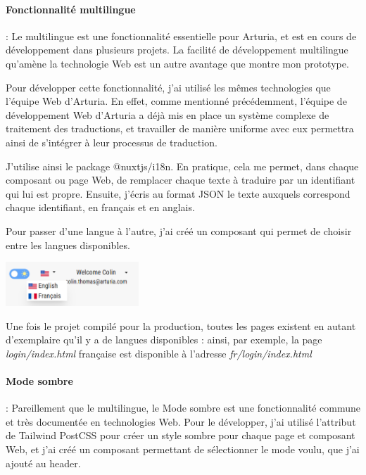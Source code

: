\documentclass[francais]{rapportPFE}  %
\begin{document}
\paragraph{Fonctionnalité multilingue}: Le multilingue est une fonctionnalité essentielle pour Arturia, et est en cours de développement dans plusieurs projets. La facilité de développement multilingue qu'amène la technologie Web est un autre avantage que montre mon prototype.

Pour développer cette fonctionnalité, j'ai utilisé les mêmes technologies que l'équipe Web d'Arturia. En effet, comme mentionné précédemment, l'équipe de développement Web d'Arturia a déjà mis en place un système complexe de traitement des traductions, et travailler de manière uniforme avec eux permettra ainsi de s'intégrer à leur processus de traduction. 

J'utilise ainsi le package @nuxtjs/i18n. En pratique, cela me permet, dans chaque composant ou page Web, de remplacer chaque texte à traduire par un identifiant qui lui est propre. Ensuite, j'écris au format JSON le texte auxquels correspond chaque identifiant, en français et en anglais.

Pour passer d'une langue à l'autre, j'ai créé un composant qui permet de choisir entre les langues disponibles.

\begin{center}
	\centering
	\includegraphics[width=5cm]{graphics/languages.png}
	\begin{tiny}
	\end{tiny}
	\label{fig}
\end{center} 

Une fois le projet compilé pour la production, toutes les pages existent en autant d'exemplaire qu'il y a de langues disponibles : ainsi, par exemple, la page \textit{login/index.html} française est disponible à l'adresse \textit{fr/login/index.html}

\paragraph{Mode sombre}: Pareillement que le multilingue, le Mode sombre est une fonctionnalité commune et très documentée en technologies Web. Pour le développer, j'ai utilisé l'attribut de Tailwind PostCSS pour créer un style sombre pour chaque page et composant Web, et j'ai créé un composant permettant de sélectionner le mode voulu, que j'ai ajouté au header. 
\end{document}
